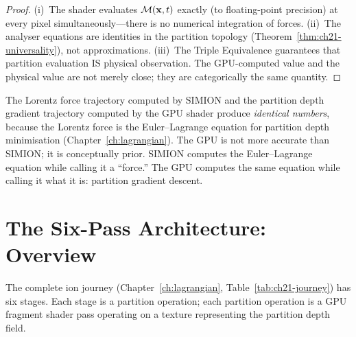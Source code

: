 \begin{proof}
  (i)~The shader evaluates $\mathcal{M}(\mathbf{x},t)$ exactly (to floating-point
  precision) at every pixel simultaneously---there is no numerical integration
  of forces.  (ii)~The analyser equations are identities in the partition
  topology (Theorem~\ref{thm:ch21-universality}), not approximations.
  (iii)~The Triple Equivalence guarantees that partition evaluation IS physical
  observation.  The GPU-computed value and the physical value are not merely
  close; they are categorically the same quantity.
\end{proof}

\begin{remark}
  The Lorentz force trajectory computed by SIMION and the partition depth
  gradient trajectory computed by the GPU shader produce \emph{identical
  numbers}, because the Lorentz force is the Euler--Lagrange equation for
  partition depth minimisation (Chapter~\ref{ch:lagrangian}).  The GPU is not
  more accurate than SIMION; it is conceptually prior.  SIMION computes the
  Euler--Lagrange equation while calling it a ``force.''  The GPU computes
  the same equation while calling it what it is: partition gradient descent.
\end{remark}

\section{The Six-Pass Architecture: Overview}
\label{sec:ch22-sixpass-overview}

The complete ion journey (Chapter~\ref{ch:lagrangian}, Table~\ref{tab:ch21-journey})
has six stages.  Each stage is a partition operation; each partition operation
is a GPU fragment shader pass operating on a texture representing the partition
depth field.

